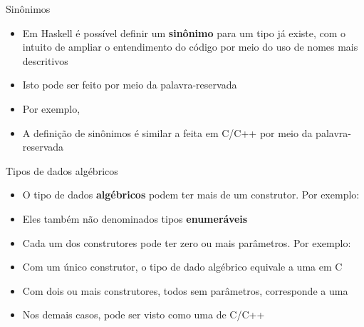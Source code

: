 \begin{frame}[fragile]{Sinônimos}

    \begin{itemize}
        \item Em Haskell é possível definir um \textbf{sinônimo} para um tipo já existe, com
            o intuito de ampliar o entendimento do código por meio do uso de nomes mais
            descritivos

        \item Isto pode ser feito por meio da palavra-reservada 

        \item Por exemplo,


        \item A definição de sinônimos é similar a feita em C/C++ por meio da palavra-reservada

    \end{itemize}

\end{frame}

\begin{frame}[fragile]{Tipos de dados algébricos}

    \begin{itemize}
        
        \item O tipo de dados \textbf{algébricos} podem ter mais de um construtor. Por exemplo:


        \item Eles também não denominados tipos \textbf{enumeráveis}

        \item Cada um dos construtores pode ter zero ou mais parâmetros. Por exemplo:


        \item Com um único construtor, o tipo de dado algébrico equivale a uma 
            em C

        \item Com dois ou mais construtores, todos sem parâmetros, corresponde a uma 

        \item Nos demais casos, pode ser visto como uma  de C/C++
    \end{itemize}

\end{frame}

